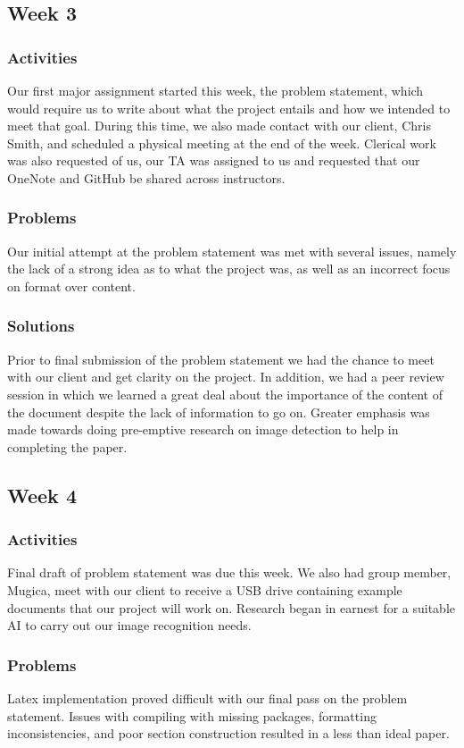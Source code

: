 \documentclass[onecolumn, draftclsnofoot,10pt, compsoc]{IEEEtran}
\begin{document}
\subsection{Week 3}
\subsubsection{Activities}
Our first major assignment started this week, the problem statement, which would require us to write about what the project entails and how we intended to meet that goal. During this time, we also made contact with our client, Chris Smith, and scheduled a physical meeting at the end of the week. Clerical work was also requested of us, our TA was assigned to us and requested that our OneNote and GitHub be shared across instructors.

\subsubsection{Problems}
Our initial attempt at the problem statement was met with several issues, namely the lack of a strong idea as to what the project was, as well as an incorrect focus on format over content.

\subsubsection{Solutions}
Prior to final submission of the problem statement we had the chance to meet with our client and get clarity on the project. In addition, we had a peer review session in which we learned a great deal about the importance of the content of the document despite the lack of information to go on. Greater emphasis was made towards doing pre-emptive research on image detection to help in completing the paper.

\subsection{Week 4}
\subsubsection{Activities}
Final draft of problem statement was due this week. We also had group member, Mugica, meet with our client to receive a USB drive containing example documents that our project will work on. Research began in earnest for a suitable AI to carry out our image recognition needs.

\subsubsection{Problems}
Latex implementation proved difficult with our final pass on the problem statement. Issues with compiling with missing packages, formatting inconsistencies, and poor section construction resulted in a less than ideal paper.
\end{document}
